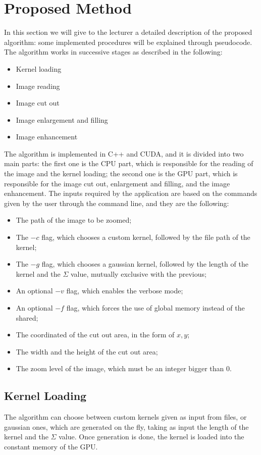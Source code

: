 \section{Proposed Method}

In this section we will give to the lecturer a detailed description of the proposed algorithm: 
some implemented procedures will be explained through pseudocode. 
The algorithm works in successive stages as described in the following:

\begin{itemize}
    \item Kernel loading
    \item Image reading
    \item Image cut out
    \item Image enlargement and filling
    \item Image enhancement
\end{itemize}

The algorithm is implemented in C++ and CUDA, and it is divided into two main parts: the first one is the CPU part, which is responsible for the reading of the image
and the kernel loading; the second one is the GPU part, which is responsible for the image cut out, enlargement and filling, and the image enhancement.
The inputs required by the application are based on the commands given by the user through the command line, and they are the following:
\begin{itemize}
    \item The path of the image to be zoomed;
    \item The $-c$ flag, which chooses a custom kernel, followed by the file path of the kernel;
    \item The $-g$ flag, which chooses a gaussian kernel, followed by the length of the kernel and the $\Sigma$ value, mutually exclusive with the previous;
    \item An optional $-v$ flag, which enables the verbose mode;
    \item An optional $-f$ flag, which forces the use of global memory instead of the shared;
    \item The coordinated of the cut out area, in the form of $x,y$;
    \item The width and the height of the cut out area;
    \item The zoom level of the image, which must be an integer bigger than 0.
\end{itemize}

    \subsection{Kernel Loading}
    The algorithm can choose between custom kernels given as input from files, or gaussian ones, which are generated on the fly,
    taking as input the length of the kernel and the $\Sigma$ value. Once generation is done, the kernel is loaded into 
    the constant memory of the GPU.\\ %

